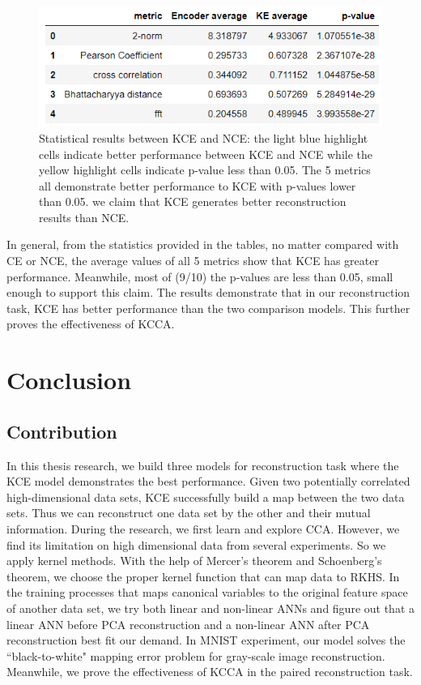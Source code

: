 \documentclass[12pt]{report} %
\begin{document}
\begin{figure}[H]
	\centering
	\includegraphics[scale=1.2]{pictures/KE-M2.png}
	\caption{Statistical results between KCE and NCE: the light blue highlight cells indicate better performance between KCE and NCE while the yellow highlight cells indicate p-value less than 0.05. The 5 metrics all demonstrate better performance to KCE with p-values lower than 0.05. we claim that KCE generates better reconstruction results than NCE.}
	\label{fig:7}
\end{figure}
In general, from the statistics provided in the tables, no matter compared with CE or NCE, the average values of all 5 metrics show that KCE has greater performance. Meanwhile, most of (9/10) the p-values are less than 0.05, small enough to support this claim. The results demonstrate that in our reconstruction task, KCE has better performance than the two comparison models. This further proves the effectiveness of KCCA. 

\chapter{Conclusion}
\section{Contribution}
In this thesis research, we build three models for reconstruction task where the KCE model demonstrates the best performance. Given two potentially correlated high-dimensional data sets, KCE successfully build a map between the two data sets. Thus we can reconstruct one data set by the other and their mutual information. During the research, we first learn and explore CCA. However, we find its limitation on high dimensional data from several experiments. So we apply kernel methods. With the help of Mercer's theorem and Schoenberg's theorem, we choose the proper kernel function that can map data to RKHS. In the training processes that maps canonical variables to the original feature space of another data set, we try both linear and non-linear ANNs and figure out that a linear ANN before PCA reconstruction and a non-linear ANN after PCA reconstruction best fit our demand. In MNIST experiment, our model solves the ``black-to-white" mapping error problem for gray-scale image reconstruction. Meanwhile, we prove the effectiveness of KCCA in the paired reconstruction task.
\end{document}
